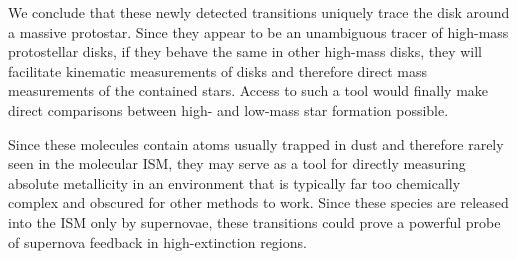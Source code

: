 \documentclass[12pt]{article}
\begin{document}
We conclude that these newly detected transitions uniquely trace the disk
around a massive protostar.  Since they appear to be an unambiguous tracer of
high-mass protostellar disks, if they behave the same in other high-mass disks,
they will facilitate kinematic measurements of disks and therefore direct mass
measurements of the contained stars.  Access to such a tool would finally make
direct comparisons between high- and low-mass star formation possible.

Since these molecules contain atoms usually trapped in dust and therefore
rarely seen in the molecular ISM, they may serve as a tool for directly
measuring absolute metallicity in an environment that is typically far too
chemically complex and obscured for other methods to work.  Since these
species are released into the ISM only by supernovae, these transitions
could prove a powerful probe of supernova feedback in high-extinction
regions. %





\end{document}
